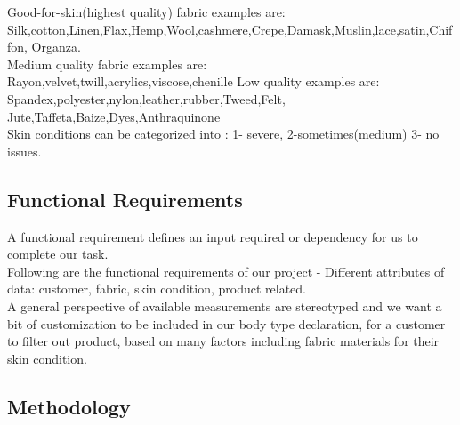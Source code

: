\documentclass[11pt,journal,compsoc]{IEEEtran}
\begin{document}
Good-for-skin(highest quality) fabric examples are: \\ Silk,cotton,Linen,Flax,Hemp,Wool,cashmere,Crepe,Damask,Muslin,lace,satin,Chiffon, Organza. \\
Medium quality fabric examples are: \\ Rayon,velvet,twill,acrylics,viscose,chenille
Low quality examples are: \\
Spandex,polyester,nylon,leather,rubber,Tweed,Felt,
Jute,Taffeta,Baize,Dyes,Anthraquinone \\
Skin conditions can be categorized into : 1- severe, 2-sometimes(medium) 3- no issues. \\

\subsection{Functional Requirements} 
A functional requirement defines an input required or dependency for us to complete our task. \\Following are the functional requirements of our project - Different attributes of data: customer, fabric, skin condition, product related. \\
A general perspective of available measurements are stereotyped and we want a bit of customization to be included in our body type declaration, for a customer to filter out product, based on many factors including fabric materials for their skin condition. \\


\subsection{Methodology} 
\end{document}
